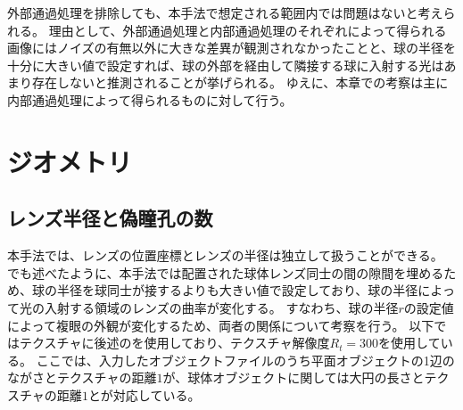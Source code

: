 外部通過処理を排除しても、本手法で想定される範囲内では問題はないと考えられる。
理由として、外部通過処理と内部通過処理のそれぞれによって得られる画像にはノイズの有無以外に大きな差異が観測されなかったことと、球の半径を十分に大きい値で設定すれば、球の外部を経由して隣接する球に入射する光はあまり存在しないと推測されることが挙げられる。
ゆえに、本章での考察は主に内部通過処理によって得られるものに対して行う。


\section{ジオメトリ}
\label{S}

\subsection{レンズ半径と偽瞳孔の数}
\label{SS}

本手法では、レンズの位置座標とレンズの半径は独立して扱うことができる。
でも述べたように、本手法では配置された球体レンズ同士の間の隙間を埋めるため、球の半径を球同士が接するよりも大きい値で設定しており、球の半径によって光の入射する領域のレンズの曲率が変化する。
すなわち、球の半径$r$の設定値によって複眼の外観が変化するため、両者の関係について考察を行う。
以下ではテクスチャに後述のを使用しており、テクスチャ解像度$R_t = 300$を使用している。
ここでは、入力したオブジェクトファイルのうち平面オブジェクトの1辺のながさとテクスチャの距離$1$が、球体オブジェクトに関しては大円の長さとテクスチャの距離$1$とが対応している。

